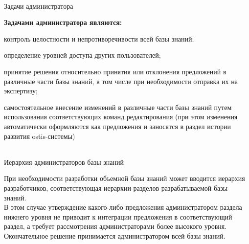 \begin{frame}{\\Задачи администратора}
	\begin{SCn}
		\textbf{Задачами администратора являются:}
		\begin{textitemize}
			\item контроль целостности и непротиворечивости всей базы знаний;
			\item определение уровней доступа других пользователей;
			\item принятие решения относительно принятия или отклонения предложений в различные части базы знаний, в том числе при необходимости отправка их на экспертизу;
			\item самостоятельное внесение изменений в различные части базы знаний	путем использования соответствующих команд редактирования (при этом изменения автоматически оформляются как предложения и заносятся в раздел
			истории развития ostis-системы)	
		\end{textitemize}
	\end{SCn}
\end{frame}

\begin{frame}{\\Иерархия администраторов базы знаний}
	\begin{SCn}
		При необходимости разработки объемной базы знаний может вводится иерархия разработчиков, соответствующая иерархии разделов разрабатываемой базы знаний.\\ 
	    В этом случае утверждение какого-либо предложения администратором раздела нижнего уровня не приводит к интеграции предложения в соответствующий раздел, а требует рассмотрения администраторами более	высокого уровня. \\ 
	    Окончательное решение принимается администратором всей базы знаний.
	\end{SCn}
\end{frame}

